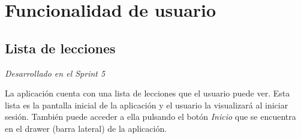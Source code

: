 \newpage

\section{Funcionalidad de usuario}
\label{sec:funcionalidad_usuario}


\subsection{Lista de lecciones}
\textit{Desarrollado en el Sprint 5}
\label{sec:lista_lecciones}

La aplicación cuenta con una lista de lecciones que el usuario puede ver. Esta lista es la pantalla inicial de la aplicación y el usuario la visualizará al iniciar sesión. También puede acceder a ella pulsando el botón \textit{Inicio} que se encuentra en el drawer (barra lateral) de la aplicación.


